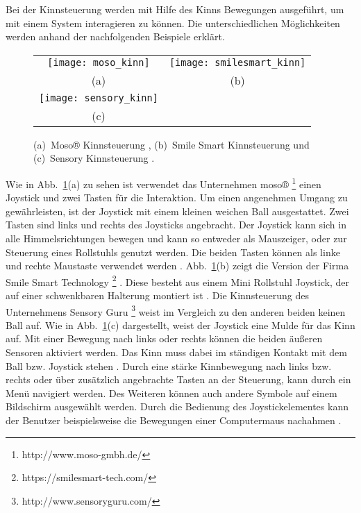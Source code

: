 Bei der Kinnsteuerung werden mit Hilfe des Kinns Bewegungen ausgeführt, um mit einem System interagieren zu können. Die unterschiedlichen Möglichkeiten werden anhand der nachfolgenden Beispiele erklärt.
%
\begin{figure}
\centering\small
\setlength{\tabcolsep}{0mm}	%
\begin{tabular}{c@{\hspace{15mm}}c} %
  \texttt{[image: moso\_kinn]} &
  \texttt{[image: smilesmart\_kinn]}
\\
  (a) & (b)
\\[5pt]	%
  \texttt{[image: sensory\_kinn]}
\\
  (c)
\end{tabular}
%
\caption{(a)~Moso® Kinnsteuerung \cite{MOSO}, (b)~Smile Smart Kinnsteuerung \cite{SMILESMART} und (c)~Sensory Kinnsteuerung \cite{SENSORY}.}
\label{fig:kinn}
\end{figure}
\newline \newline
Wie in Abb.~\ref{fig:kinn}(a) zu sehen ist verwendet das Unternehmen moso®%
\footnote{http://www.moso-gmbh.de/}
%
einen Joystick und zwei Tasten für die Interaktion. Um einen angenehmen Umgang zu gewährleisten, ist der Joystick mit einem kleinen weichen Ball ausgestattet. Zwei Tasten sind links und rechts des Joysticks angebracht. Der Joystick kann sich in alle Himmelsrichtungen bewegen und kann so entweder als Mauszeiger, oder zur Steuerung eines Rollstuhls genutzt werden. Die beiden Tasten können als linke und rechte Maustaste verwendet werden \cite{MOSO}.
\newline
Abb.~\ref{fig:kinn}(b) zeigt die Version der Firma Smile Smart Technology%
\footnote{https://smilesmart-tech.com/}
%
. Diese besteht aus einem Mini Rollstuhl Joystick, der auf einer schwenkbaren Halterung montiert ist \cite{SMILESMART}.
\newline
Die Kinnsteuerung des Unternehmens Sensory Guru%
\footnote{http://www.sensoryguru.com/}
%
weist im Vergleich zu den anderen beiden keinen Ball auf. Wie in Abb.~\ref{fig:kinn}(c) dargestellt, weist der Joystick eine Mulde für das Kinn auf. Mit einer Bewegung nach links oder rechts können die beiden äußeren Sensoren aktiviert werden. Das Kinn muss dabei im ständigen Kontakt mit dem Ball bzw. Joystick stehen \cite{SENSORY}. 
\newline
Durch eine stärke Kinnbewegung nach links bzw. rechts oder über zusätzlich angebrachte Tasten an der Steuerung, kann durch ein Menü navigiert werden. Des Weiteren können auch andere Symbole auf einem Bildschirm ausgewählt werden. Durch die Bedienung des Joystickelementes kann der Benutzer beispielsweise die Bewegungen einer Computermaus nachahmen \cite{MOSO} \cite{SENSORY}. 
